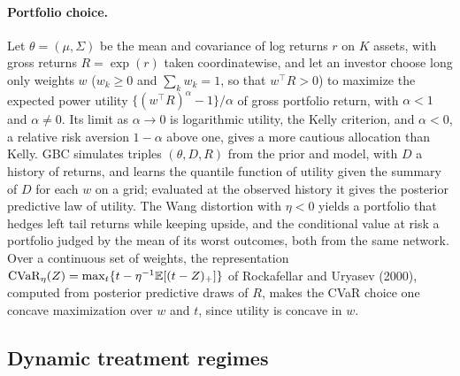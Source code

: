 \paragraph{Portfolio choice.} Let $\theta = (\mu,\Sigma)$ be the mean and covariance of log returns $r$ on $K$ assets, with gross returns $R = \exp(r)$ taken coordinatewise, and let an investor choose long only weights $w$ ($w_k\ge0$ and $\sum_k w_k=1$, so that $w^\top R>0$) to maximize the expected power utility $\{(w^\top R)^\alpha-1\}/\alpha$ of gross portfolio return, with $\alpha<1$ and $\alpha\ne0$. Its limit as $\alpha\to0$ is logarithmic utility, the Kelly criterion, and $\alpha<0$, a relative risk aversion $1-\alpha$ above one, gives a more cautious allocation than Kelly. GBC simulates triples $(\theta,D,R)$ from the prior and model, with $D$ a history of returns, and learns the quantile function of utility given the summary of $D$ for each $w$ on a grid; evaluated at the observed history it gives the posterior predictive law of utility. The Wang distortion with $\eta<0$ yields a portfolio that hedges left tail returns while keeping upside, and the conditional value at risk a portfolio judged by the mean of its worst outcomes, both from the same network. Over a continuous set of weights, the representation $\mathrm{CVaR}_\eta(Z)=\max_t\{t-\eta^{-1}\mathbb{E}[(t-Z)_+]\}$ of Rockafellar and Uryasev (2000), computed from posterior predictive draws of $R$, makes the CVaR choice one concave maximization over $w$ and $t$, since utility is concave in $w$.

\subsection{Dynamic treatment regimes}\label{gbc:sec:dynamic}

